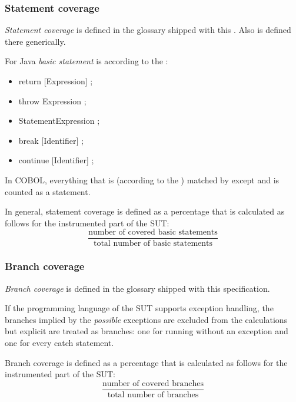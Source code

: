 \subsubsection{Statement coverage}
\textit{Statement coverage} is defined in the glossary shipped with this . Also \textit{} is defined there generically.
\par
For Java \textit{basic statement} is according to the :
\begin{itemize}
  \item return [Expression] ;
  \item throw Expression ;
  \item StatementExpression ;
  \item break [Identifier] ;
  \item continue [Identifier] ;
\end{itemize}
\par
In COBOL, everything that is (according to the ) matched by  except  and  is counted as a statement.
\par
In general, statement coverage is defined as a percentage that
is calculated as follows for the instrumented part of the SUT:
\begin{equation*}
\frac{\text{number of covered basic statements}}{\text{total number of basic statements}}
\end{equation*}

\subsubsection{Branch coverage}
\textit{Branch coverage} is defined in the glossary shipped with this specification.
\par
If the programming language of the SUT supports exception handling, the branches implied by the \emph{possible} exceptions are excluded from the  calculations but explicit  are treated as branches: one for running without an exception and one for every catch statement.
\par
Branch coverage is defined as a percentage that is calculated as follows for the instrumented part of the SUT:
\begin{equation*}
\frac{\text{number of covered branches}}{\text{total number of branches}}
\end{equation*}

